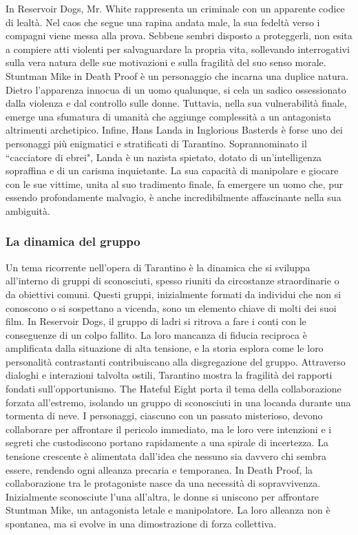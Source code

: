 \documentclass[12pt]{article} %
\begin{document}
\begin{flushleft}
    In Reservoir Dogs, Mr. White rappresenta un criminale con un apparente codice di lealtà. Nel caos che segue una rapina andata male, la sua fedeltà verso i compagni viene messa alla prova. Sebbene sembri disposto a proteggerli, non esita a compiere atti violenti per salvaguardare la propria vita, sollevando interrogativi sulla vera natura delle sue motivazioni e sulla fragilità del suo senso morale.
    Stuntman Mike in Death Proof è un personaggio che incarna una duplice natura. Dietro l'apparenza innocua di un uomo qualunque, si cela un sadico ossessionato dalla violenza e dal controllo sulle donne. Tuttavia, nella sua vulnerabilità finale, emerge una sfumatura di umanità che aggiunge complessità a un antagonista altrimenti archetipico.
    Infine, Hans Landa in Inglorious Basterds è forse uno dei personaggi più enigmatici e stratificati di Tarantino. Soprannominato il ``cacciatore di ebrei", Landa è un nazista spietato, dotato di un'intelligenza sopraffina e di un carisma inquietante. La sua capacità di manipolare e giocare con le sue vittime, unita al suo tradimento finale, fa emergere un uomo che, pur essendo profondamente malvagio, è anche incredibilmente affascinante nella sua ambiguità.
    \subsubsection*{La dinamica del gruppo}
    Un tema ricorrente nell'opera di Tarantino è la dinamica che si sviluppa all'interno di gruppi di sconosciuti, spesso riuniti da circostanze straordinarie o da obiettivi comuni. Questi gruppi, inizialmente formati da individui che non si conoscono o si sospettano a vicenda, sono un elemento chiave di molti dei suoi film.
    In Reservoir Dogs, il gruppo di ladri si ritrova a fare i conti con le conseguenze di un colpo fallito. La loro mancanza di fiducia reciproca è amplificata dalla situazione di alta tensione, e la storia esplora come le loro personalità contrastanti contribuiscano alla disgregazione del gruppo. Attraverso dialoghi e interazioni talvolta ostili, Tarantino mostra la fragilità dei rapporti fondati sull'opportunismo.
    The Hateful Eight porta il tema della collaborazione forzata all'estremo, isolando un gruppo di sconosciuti in una locanda durante una tormenta di neve. I personaggi, ciascuno con un passato misterioso, devono collaborare per affrontare il pericolo immediato, ma le loro vere intenzioni e i segreti che custodiscono portano rapidamente a una spirale di incertezza. La tensione crescente è alimentata dall'idea che nessuno sia davvero chi sembra essere, rendendo ogni alleanza precaria e temporanea.
    In Death Proof, la collaborazione tra le protagoniste nasce da una necessità di sopravvivenza. Inizialmente sconosciute l'una all'altra, le donne si uniscono per affrontare Stuntman Mike, un antagonista letale e manipolatore. La loro alleanza non è spontanea, ma si evolve in una dimostrazione di forza collettiva.

\end{flushleft}
\end{document}
